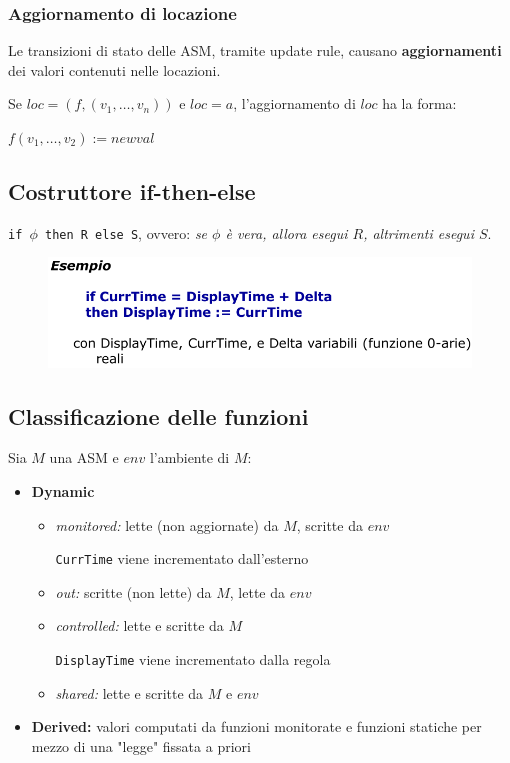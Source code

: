\subsubsection{Aggiornamento di locazione}

Le transizioni di stato delle ASM, tramite update rule, causano \textbf{aggiornamenti}
dei valori contenuti nelle locazioni.

\noindent Se $loc = (f,(v_1, \dots, v_n))$ e $loc = a$, l'aggiornamento di $loc$ ha la forma:

$f(v_1, \dots, v_2) := newval$

\subsection{Costruttore if-then-else}

\texttt{if $\phi$ then R else S}, ovvero: \textit{se $\phi$ è vera, allora esegui $R$, altrimenti
esegui $S$}.

\begin{figure}[H]
    \centering
    \includegraphics[width=0.8\linewidth]{chapters/1-asm/images/ex1.png}
\end{figure}

\subsection{Classificazione delle funzioni}

\noindent Sia $M$ una ASM e $env$ l'ambiente di $M$:
\begin{itemize}
    \item \textbf{Dynamic}
    \begin{itemize}
        \item \textit{monitored:} lette (non aggiornate) da $M$, scritte da $env$
        
        \texttt{CurrTime} viene incrementato dall'esterno
        \item \textit{out:} scritte (non lette) da $M$, lette da $env$
        \item \textit{controlled:} lette e scritte da $M$
        
        \texttt{DisplayTime} viene incrementato dalla regola
        \item \textit{shared:} lette e scritte da $M$ e $env$  
    \end{itemize}
    \item \textbf{Derived:} valori computati da funzioni monitorate e funzioni statiche 
    per mezzo di una "legge" fissata a priori 
\end{itemize}

